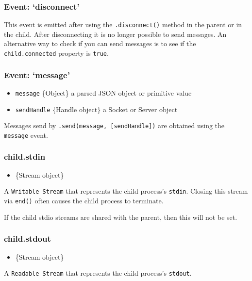 \subsubsection{Event: `disconnect'}

This event is emitted after using the \texttt{.disconnect()} method in
the parent or in the child. After disconnecting it is no longer possible
to send messages. An alternative way to check if you can send messages
is to see if the \texttt{child.connected} property is \texttt{true}.

\subsubsection{Event: `message'}

\begin{itemize}
\item
  \texttt{message} \{Object\} a parsed JSON object or primitive value
\item
  \texttt{sendHandle} \{Handle object\} a Socket or Server object
\end{itemize}

Messages send by \texttt{.send(message, {[}sendHandle{]})} are obtained
using the \texttt{message} event.

\subsubsection{child.stdin}

\begin{itemize}
\item
  \{Stream object\}
\end{itemize}

A \texttt{Writable Stream} that represents the child process's
\texttt{stdin}. Closing this stream via \texttt{end()} often causes the
child process to terminate.

If the child stdio streams are shared with the parent, then this will
not be set.

\subsubsection{child.stdout}

\begin{itemize}
\item
  \{Stream object\}
\end{itemize}

A \texttt{Readable Stream} that represents the child process's
\texttt{stdout}.

